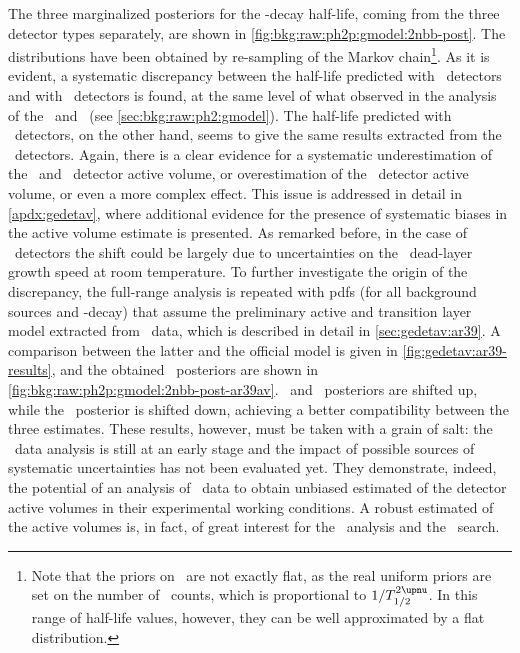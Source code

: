 \blocktitle{\thalftwo}
The three marginalized posteriors for the \nnbb-decay half-life, coming from the three
detector types separately, are shown in \cref{fig:bkg:raw:ph2p:gmodel:2nbb-post}. The
distributions have been obtained by re-sampling of the Markov chain\footnote{%
  Note that the priors on \thalftwo\ are not exactly flat, as the real uniform priors are
  set on the number of \nnbb\ counts, which is proportional to $1/\thalftwoM$. In this
  range of half-life values, however, they can be well approximated by a flat
  distribution.
}. As it is evident, a systematic discrepancy between the half-life predicted with \bege\
detectors and with \scoax\ detectors is found, at the same level of what observed in the
analysis of the \enrBEGeII\ and \enrCoaxII\ (see \cref{sec:bkg:raw:ph2:gmodel}). The
half-life predicted with \icoax\ detectors, on the other hand, seems to give the same
results extracted from the \scoax\ detectors. Again, there is a clear evidence for a
systematic underestimation of the \scoax\ and \icoax\ detector active volume, or
overestimation of the \bege\ detector active volume, or even a more complex effect. This
issue is addressed in detail in \cref{apdx:gedetav}, where additional evidence for the
presence of systematic biases in the active volume estimate is presented. As remarked
before, in the case of \bege\ detectors the shift could be largely due to uncertainties on
the \nplus\ dead-layer growth speed at room temperature.
\newpar
To further investigate the origin of the discrepancy, the full-range analysis is repeated
with pdfs (for all background sources and \nnbb-decay) that assume the preliminary active
and transition layer model extracted from \Arl\ data, which is described in detail in
\cref{sec:gedetav:ar39}. A comparison between the latter and the official model is given
in \cref{fig:gedetav:ar39-results}, and the obtained \thalftwo\ posteriors are shown in
\cref{fig:bkg:raw:ph2p:gmodel:2nbb-post-ar39av}. \icoax\ and \scoax\ posteriors are
shifted up, while the \bege\ posterior is shifted down, achieving a better compatibility
between the three estimates. These results, however, must be taken with a grain of salt:
the \Arl\ data analysis is still at an early stage and the impact of possible sources of
systematic uncertainties has not been evaluated yet. They demonstrate, indeed, the
potential of an analysis of \Arl\ data to obtain unbiased estimated of the detector active
volumes in their experimental working conditions. A robust estimated of the active volumes
is, in fact, of great interest for the \nnbb\ analysis and the \onbb\ search.

